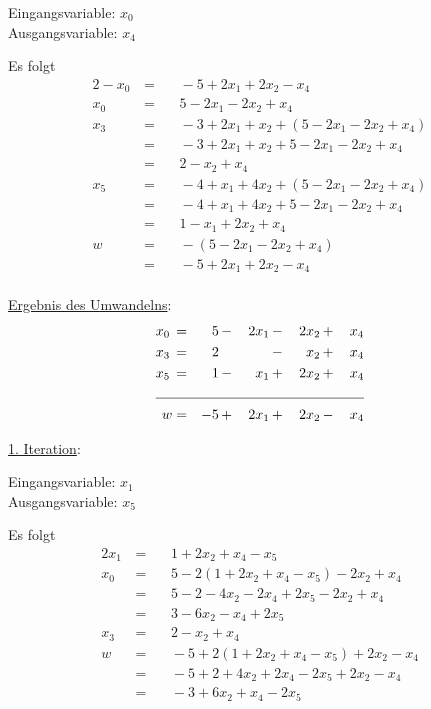 \documentclass[10pt,a4paper,oneside,ngerman,numbers=noenddot]{scrartcl}
\begin{document}
		Eingangsvariable: $x_{0}$\\
		Ausgangsvariable: $x_{4}$
		
		Es folgt
		\begin{alignat*}{2}
			-x_{0} \,&=&&\, -5 + 2x_{1} + 2x_{2} - x_{4} \\
			x_{0} \,&=&&\, 5 - 2x_{1} - 2x_{2} + x_{4} \\			
			x_{3} \,&=&&\, -3 + 2x_{1} + x_{2} + \left(5 - 2x_{1} - 2x_{2} + x_{4}\right) \\			
			&=&&\, -3 + 2x_{1} + x_{2} + 5 - 2x_{1} - 2x_{2} + x_{4} \\
			&=&&\, 2 - x_{2} + x_{4} \\
			x_{5} \,&=&&\, -4 + x_{1} + 4x_{2} + \left(5 - 2x_{1} - 2x_{2} + x_{4}\right) \\
			&=&&\, -4 + x_{1} + 4x_{2} + 5 - 2x_{1} - 2x_{2} + x_{4} \\
			&=&&\, 1 - x_{1} + 2x_{2} + x_{4} \\
			w \,&=&&\, -\left(5 - 2x_{1} - 2x_{2} + x_{4}\right) \\
			&=&&\, -5 + 2x_{1} + 2x_{2} - x_{4} \\
		\end{alignat*}
		
		\underline{Ergebnis des Umwandelns}:
		\begin{alignat*}{5}
			x_{0} \,&=&\, 5 \,&-&\, 2x_{1} \,&-&\, 2x_{2} \,&+&\, x_{4} \\
			x_{3} \,&=&\, 2 \,&& &-&\, x_{2} \,&+&\, x_{4} \\
			x_{5} \,&=&\, 1 \,&-&\, x_{1} \,&+&\, 2x_{2} \,&+&\, x_{4} \\ \cline{1 - 9}
			w &=& -5 \,&+&\, 2x_{1} \,&+&\, 2x_{2} \,&-&\, x_{4}
		\end{alignat*}
		
		\underline{1. Iteration}:
		
		Eingangsvariable: $x_{1}$ \\
		Ausgangsvariable: $x_{5}$
		
		Es folgt
		\begin{alignat*}{2}
			x_{1} \,&=&&\, 1 + 2x_{2} + x_{4} - x_{5} \\
			x_{0} \,&=&&\, 5 - 2\left(1 + 2x_{2} + x_{4} - x_{5}\right) - 2x_{2} + x_{4} \\
			&=&&\, 5 - 2 - 4x_{2} - 2x_{4} + 2x_{5} - 2x_{2} + x_{4} \\
			&=&&\, 3 - 6x_{2} - x_{4} + 2x_{5} \\
			x_{3} \,&=&&\, 2 - x_{2} + x_{4} \\			
			w \,&=&&\, -5 + 2\left(1 + 2x_{2} + x_{4} - x_{5}\right) + 2x_{2} - x_{4} \\
			&=&&\, -5 + 2 + 4x_{2} + 2x_{4} - 2x_{5} + 2x_{2} - x_{4} \\
			&=&&\, -3 + 6x_{2} + x_{4} - 2x_{5}
		\end{alignat*}
		
\end{document}
